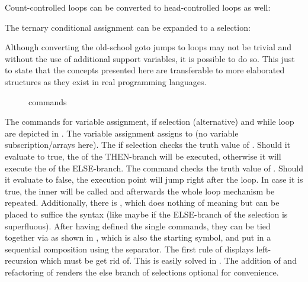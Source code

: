 Count-controlled loops can be converted to head-controlled loops as well:

The ternary conditional assignment can be expanded to a selection:





Although converting the old-school goto jumps to loops may not be trivial and without the use of additional support variables, it is possible to do so. This just to state that the concepts presented here are transferable to more elaborated structures as they exist in real programming languages.

\begin{figure}
	

	\caption{commands}
	\label{fig:grammar_core_cmds}
\end{figure}

The commands for variable assignment, if selection (alternative) and while loop are depicted in . The variable assignment  assigns  to  (no variable subscription/arrays here). The if selection  checks the truth value of . Should it evaluate to true, the  of the THEN-branch will be executed, otherwise it will execute the  of the ELSE-branch. The  command checks the truth value of . Should it evaluate to false, the execution point will jump right after the loop. In case it is true, the inner  will be called and afterwards the whole loop mechanism be repeated. Additionally, there is , which does nothing of meaning but can be placed to suffice the syntax (like maybe if the ELSE-branch of the selection is superfluous). After having defined the single commands, they can be tied together via  as shown in , which is also the starting symbol, and put in a sequential composition using the \textterminal{\opprogsep{}} separator. The first rule of  displays left-recursion which must be get rid of. This is easily solved in . The addition of  and refactoring of  renders the else branch of selections optional for convenience.

